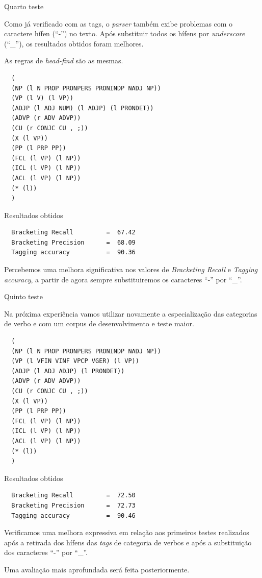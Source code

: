 Quarto teste

Como já verificado com as tags, o \emph{parser} também exibe problemas com o caractere hífen (``{-}'') no texto. Após substituir todos os hífens por \emph{underscore} (``\_''), os resultados obtidos foram melhores.

As regras de \emph{head-find} são as mesmas.

\scriptsize
\begin{verbatim}
  (
  (NP (l N PROP PRONPERS PRONINDP NADJ NP))
  (VP (l V) (l VP))
  (ADJP (l ADJ NUM) (l ADJP) (l PRONDET))
  (ADVP (r ADV ADVP))
  (CU (r CONJC CU , ;))
  (X (l VP))
  (PP (l PRP PP))
  (FCL (l VP) (l NP))
  (ICL (l VP) (l NP))
  (ACL (l VP) (l NP))
  (* (l))
  )
\end{verbatim}

Resultados obtidos

\begin{verbatim}
  Bracketing Recall         =  67.42
  Bracketing Precision      =  68.09
  Tagging accuracy          =  90.36
\end{verbatim}

\normalsize

Percebemos uma melhora significativa nos valores de \emph{Bracketing Recall} e \emph{Tagging accuracy}, a partir de agora sempre substituiremos os caracteres ``{-}'' por ``\_''.

Quinto teste

Na próxima experiência vamos utilizar novamente a especialização das categorias de verbo e com um corpus de desenvolvimento e teste maior.

\scriptsize

\begin{verbatim}
  (
  (NP (l N PROP PRONPERS PRONINDP NADJ NP))
  (VP (l VFIN VINF VPCP VGER) (l VP))
  (ADJP (l ADJ ADJP) (l PRONDET))
  (ADVP (r ADV ADVP))
  (CU (r CONJC CU , ;))
  (X (l VP))
  (PP (l PRP PP))
  (FCL (l VP) (l NP))
  (ICL (l VP) (l NP))
  (ACL (l VP) (l NP))
  (* (l))
  )
\end{verbatim}


Resultados obtidos


\begin{verbatim}
  Bracketing Recall         =  72.50
  Bracketing Precision      =  72.73
  Tagging accuracy          =  90.46
\end{verbatim}

\normalsize
Verificamos uma melhora expressiva em relação aos primeiros testes realizados após a retirada dos hífens das \emph{tags} de categoria de verbos e após a substituição dos caracteres ``{-}'' por ``\_''.

Uma avaliação mais aprofundada será feita posteriormente. 
